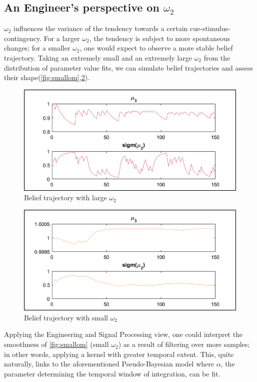 \documentclass{article}
\begin{document}
\begin{multicols}{2}
\vspace{-1.3cm}
\subsection*{An Engineer's perspective on $\omega_2$}

$\omega_2$ influences the variance of the tendency towards a certain cue-stimulus-contingency. For a larger $\omega_2$, the tendency is subject to more spontaneous changes; for a smaller $\omega_2$, one would expect to observe a more stable belief trajectory. Taking an extremely small and an extremely large $\omega_2$ from the distribution of parameter value fits, we can simulate belief trajectories and assess their shape(\autoref{fig:smallom},\ref{fig:largeom}). 

\hfill\null
\columnbreak

\begin{figure}[H]
\centering
\includegraphics[width=.44\textwidth]{example_steep.png}
\caption{Belief trajectory with large $\omega_2$}
\label{fig:smallom}
\end{figure}%
\vspace{-7mm}
\begin{figure}[H]
\centering
\includegraphics[width=.44\textwidth]{example_smooth.png}
\caption{Belief trajectory with small $\omega_2$}
\label{fig:largeom}
\end{figure}


Applying the Engineering and Signal Processing view, one could interpret the smoothness of \autoref{fig:smallom} (small $\omega_2$) as a result of filtering over more samples; in other words, applying a kernel with greater temporal extent. This, quite naturally, links to the aforementioned Pseudo-Bayesian model where $\alpha$, the parameter determining the temporal window of integration, can be fit. \\


\end{multicols}
\end{document}
